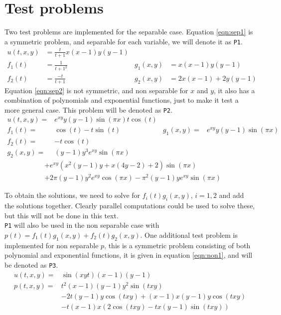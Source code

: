 \section{Test problems} \label{sec:test}
Two test problems are implemented for the separable case. Equation \eqref{eqn:sep1} is a symmetric problem, and separable for each variable, we will denote it as \texttt{P1}. 
\begin{equation} \label{eqn:sep1}
\begin{aligned}
 u(t,x,y)&= \frac{t}{t+1} x(x-1)y(y-1) \\
 f_1(t)&=\frac{1}{t+1^2} & g_1(x,y)&= x(x-1)y(y-1) \\
 f_2(t) &= \frac{-t}{t+1} & g_2(x,y)& = 2x(x-1) +2y(y-1)
 \end{aligned}
\end{equation}
Equation \eqref{eqn:sep2} is not symmetric, and non separable for $x$ and $y$, it also has a combination of polynomials and exponential functions, just to make it test a more general case. 
This problem will be denoted as \texttt{P2}.\\
\begin{equation} \label{eqn:sep2}
\begin{aligned}
 u(t,x,y)=& e^{xy}y(y-1) \sin( \pi x)t \cos(t)& \\
 f_1(t) =& \cos(t)-t \sin(t)  & g_1(x,y) =&e^{xy}y(y-1) \sin( \pi x)\\
 f_2(t) =& -t \cos(t) \\ g_2(x,y) =&(y-1)y^3e^{xy} \sin ( \pi x)
 \end{aligned}
\end{equation}
\begin{equation*}
\begin{aligned}
&+e^{xy}(x^2(y-1)y+x(4y-2)+2) \sin( \pi x) \\&+2 \pi (y-1) y^2 e^{xy} \cos( \pi x)- \pi^2 (y-1)y e^{xy} \sin( \pi x )
 \end{aligned}
\end{equation*}

To obtain the solutions, we need to solve for $f_i(t) g_i(x,y)$, $i = 1,2 $ and add the solutions together. Clearly parallel computations could be used to solve these, but this will not be done in this text. \\

\texttt{P1} will also be used in the non separable case with $p(t) = f_1(t) g_1(x,y) + f_2(t) g_2(x,y)$.
One additional test problem is implemented for non separable $p$, this is a symmetric problem consisting of both polynomial and exponential functions, it is given in equation \eqref{eqn:non1}, and will be denoted as \texttt{P3}.
\begin{equation} \label{eqn:non1}
\begin{aligned}
 u(t,x,y) = & \sin(x y t) (x-1) (y-1)\\
 p(t,x,y) = & t^2 (x-1) (y-1) y^2 \sin(t x y)\\ & -2 t (y-1) y \cos(t x y)+(x-1) x (y-1) y \cos(t x y)\\ & -t (x-1) x (2 \cos(t x y)-t x (y-1) \sin(t x y))
\end{aligned}
\end{equation}
